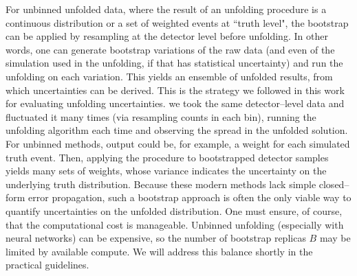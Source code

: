             For unbinned unfolded data, where the result of an unfolding procedure is a continuous distribution or a set of weighted events at ``truth level", the bootstrap can be applied by resampling at the detector level before unfolding.
            In other words, one can generate bootstrap variations of the raw data (and even of the simulation used in the unfolding, if that has statistical uncertainty) and run the unfolding on each variation.
            This yields an ensemble of unfolded results, from which uncertainties can be derived.
            This is the strategy we followed in this work for evaluating unfolding uncertainties.
            we took the same detector--level data and fluctuated it many times (via resampling counts in each bin), running the unfolding algorithm each time and observing the spread in the unfolded solution.
           For unbinned methods, output could be, for example, a weight for each simulated truth event.
           Then, applying the procedure to bootstrapped detector samples yields many sets of weights, whose variance indicates the uncertainty on the underlying truth distribution.
           Because these modern methods lack simple closed--form error propagation, such a bootstrap approach is often the only viable way to quantify uncertainties on the unfolded distribution.
           One must ensure, of course, that the computational cost is manageable.
           Unbinned unfolding (especially with neural networks) can be expensive, so the number of bootstrap replicas $B$ may be limited by available compute.
           We will address this balance shortly in the practical guidelines.

